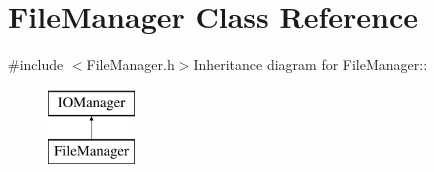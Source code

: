 \hypertarget{classJKBuilder_1_1FileManager}{
\section{FileManager Class Reference}
\label{classJKBuilder_1_1FileManager}
}


{\ttfamily \#include $<$FileManager.h$>$}Inheritance diagram for FileManager::\begin{figure}[H]
\begin{center}
\leavevmode
\includegraphics[height=2cm]{classJKBuilder_1_1FileManager}
\end{center}
\end{figure}
